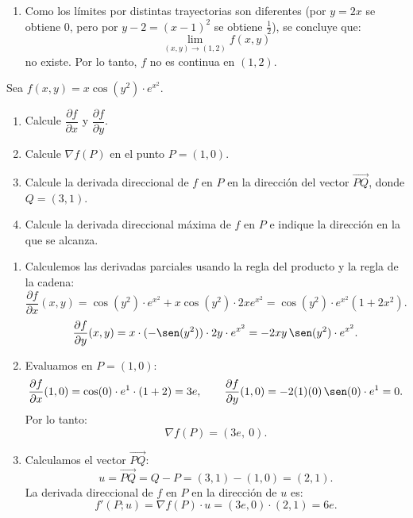 \documentclass[11pt,respuestas,a4]{aleph-examen}
\begin{document}
\begin{preguntas}
\begin{respuesta}
\begin{enumerate}
    \item Como los límites por distintas trayectorias son diferentes (por $y=2x$ se obtiene $0$, pero por $y-2=(x-1)^2$ se obtiene $\tfrac{1}{2}$), se concluye que:
    \[
        \lim_{(x,y)\to(1,2)} f(x,y)
    \]
    no existe. Por lo tanto, $f$ no es continua en $(1,2)$.\qedhere
\end{enumerate}
\end{respuesta}


\item
Sea $f(x,y)=x\cos(y^2)\cdot e^{x^2}$.
\begin{enumerate}[leftmargin=*]
    \item Calcule $\dfrac{\partial f}{\partial x}$ y $\dfrac{\partial f}{\partial y}$.
    \item Calcule $\nabla f(P)$ en el punto $P=(1,0)$.
    \item Calcule la derivada direccional de $f$ en $P$ en la dirección del vector $\overrightarrow{PQ}$, donde $Q=(3,1)$.
    \item Calcule la derivada direccional máxima de $f$ en $P$ e indique la dirección en la que se alcanza.
\end{enumerate}


\begin{respuesta}
\begin{enumerate}
    \item Calculemos las derivadas parciales usando la regla del producto y la regla de la cadena:
    \[
        \frac{\partial f}{\partial x}(x,y)
        =
        \cos(y^2)\cdot e^{x^2}+x\cos(y^2)\cdot 2x e^{x^2}
        =
        \cos(y^2)\cdot e^{x^2}(1+2x^2).
    \]
    \[
        \frac{\partial f}{\partial y}(x,y)
        =
        x\cdot(-\sen(y^2))\cdot 2y\cdot e^{x^2}
        =
        -2xy\,\sen(y^2)\cdot e^{x^2}.
    \]

    \item Evaluamos en $P=(1,0)$:
    \[
        \frac{\partial f}{\partial x}(1,0)
        =
        \cos(0)\cdot e^{1}\cdot(1+2)
        =
        3e,
        \qquad
        \frac{\partial f}{\partial y}(1,0)
        =
        -2(1)(0)\,\sen(0)\cdot e^{1}
        =
        0.
    \]
    Por lo tanto:
    \[
        \nabla f(P)
        =
        (3e,\ 0).
    \]

    \item Calculamos el vector $\overrightarrow{PQ}$:
    \[
        u = \overrightarrow{PQ}
        =
        Q-P
        =
        (3,1)-(1,0)
        =
        (2,1).
    \]
    La derivada direccional de $f$ en $P$ en la dirección de $u$ es:
    \[
        f'(P;u)
        =
        \nabla f(P)\cdot u
        =
        (3e,0)\cdot(2,1)
        =
        6e.
    \]


\end{enumerate}
\end{respuesta}
\end{preguntas}
\end{document}
